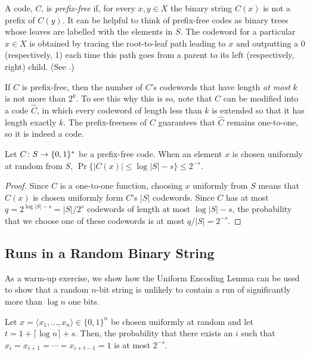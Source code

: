 \documentclass[lotsofwhite]{patmorin}
\begin{document}
A code, $C$, is \emph{prefix-free} if, for every $x,y\in X$ the binary
string $C(x)$ is not a prefix of $C(y)$.  It can be helpful to think of
prefix-free codes as binary trees whose leaves are labelled with the
elements in $S$.  The codeword for a particular $x\in X$ is obtained
by tracing the root-to-leaf path leading to $x$ and outputting a 0
(respectively, 1) each time this path goes from a parent to its left
(respectively, right) child. (See .)

If $C$ is prefix-free, then the number of $C$'s codewords that have
length \emph{at most} $k$ is not more than $2^k$. To see this why this
is so, note that $C$ can be modified into a code $\hat C$, in which
every codeword of length less than $k$ is extended so that it has length
exactly $k$. The prefix-freeness of $C$ guarantees that $\hat C$ remains
one-to-one, so it is indeed a code.


\begin{lem}
Let $C\colon S\to \{0,1\}^*$ be a prefix-free code. When an element $x$ is chosen uniformly at random from $S$, $\Pr\{|C(x)|\le \log|S|-s\}\le 2^{-s}$.
\end{lem}

\begin{proof}
Since $C$ is a one-to-one function, choosing $x$ uniformly from $S$
means that $C(x)$ is chosen uniformly form $C$'s $|S|$ codewords. Since
$C$ has at most $q=2^{\log|S|-s}=|S|/2^s$ codewords of length at most
$\log|S|-s$, the probability that we choose one of these codewords is
at most $q/|S|=2^{-s}$.
\end{proof}

\subsection{Runs in a Random Binary String}

As a warm-up exercise, we show how the Uniform Encoding Lemma can be
used to show that a random $n$-bit string is unlikely to contain a run
of significantly more than $\log n$ one bits.

\begin{thm}
  Let $x=\langle x_1,\ldots,x_n\rangle\in\{0,1\}^n$ be chosen uniformly
  at random and let $t=1+\lceil\log n\rceil + s$. Then, the probability
  that there exists an $i$ such that $x_i=x_{i+1}=\cdots=x_{i+t-1}=1$
  is at most $2^{-s}$.
\end{thm}
\end{document}
